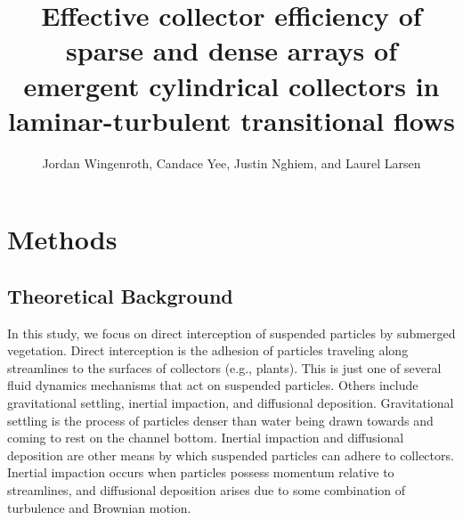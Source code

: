 \documentclass{scrreprt}
\author{Jordan Wingenroth, Candace Yee, Justin Nghiem, and Laurel Larsen}
\title{Effective collector efficiency of sparse and dense arrays of emergent cylindrical collectors in laminar-turbulent transitional flows}
\newcommand\Rey{\mathrm{Re}}
\begin{document}
\maketitle

%
%
%
%
%
%

\setcounter{chapter}{1}

\chapter{Methods}

\section{Theoretical Background}

In this study, we focus on direct interception of suspended particles by submerged vegetation. Direct interception is the adhesion of particles traveling along streamlines to the surfaces of collectors (e.g., plants). This is just one of several fluid dynamics mechanisms that act on suspended particles. Others include gravitational settling, inertial impaction, and diffusional deposition. Gravitational settling is the process of particles denser than water being drawn towards and coming to rest on the channel bottom. Inertial impaction and diffusional deposition are other means by which suspended particles can adhere to collectors. Inertial impaction occurs when particles possess momentum relative to streamlines, and diffusional deposition arises due to some combination of turbulence and Brownian motion.
\end{document}
